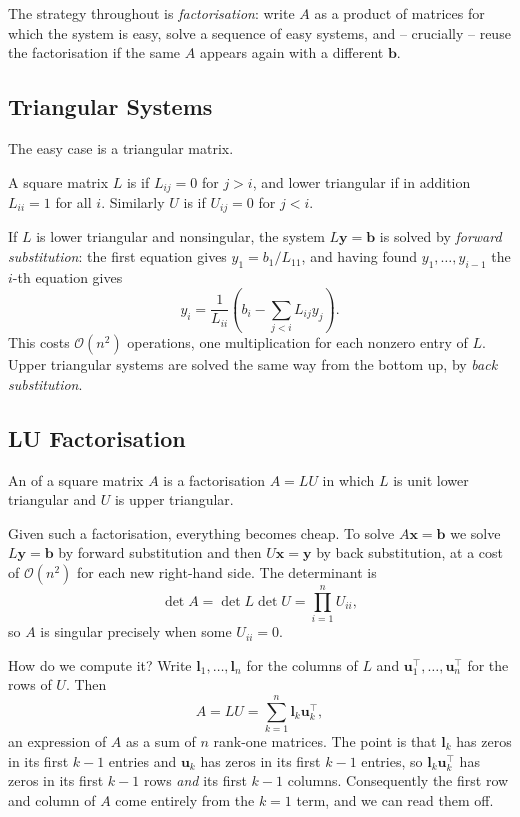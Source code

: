 The strategy throughout is \emph{factorisation}: write $A$ as a product of matrices for which the system is easy, solve a sequence of easy systems, and -- crucially -- reuse the factorisation if the same $A$ appears again with a different $\mathbf{b}$.

\subsection{Triangular Systems}

The easy case is a triangular matrix.

\begin{definition}
  A square matrix $L$ is  if $L_{ij} = 0$ for $j > i$, and  lower triangular if in addition $L_{ii} = 1$ for all $i$. Similarly $U$ is  if $U_{ij} = 0$ for $j < i$.
\end{definition}

If $L$ is lower triangular and nonsingular, the system $L\mathbf{y} = \mathbf{b}$ is solved by \emph{forward substitution}: the first equation gives $y_1 = b_1/L_{11}$, and having found $y_1, \dots, y_{i-1}$ the $i$-th equation gives
$$
y_i = \frac{1}{L_{ii}}\left(b_i - \sum_{j<i}L_{ij}y_j\right).
$$
This costs $\mathcal{O}(n^2)$ operations, one multiplication for each nonzero entry of $L$. Upper triangular systems are solved the same way from the bottom up, by \emph{back substitution}.

\subsection{LU Factorisation}

\begin{definition}[LU Factorisation]
  An  of a square matrix $A$ is a factorisation $A = LU$ in which $L$ is unit lower triangular and $U$ is upper triangular.
\end{definition}

Given such a factorisation, everything becomes cheap. To solve $A\mathbf{x} = \mathbf{b}$ we solve $L\mathbf{y} = \mathbf{b}$ by forward substitution and then $U\mathbf{x} = \mathbf{y}$ by back substitution, at a cost of $\mathcal{O}(n^2)$ for each new right-hand side. The determinant is
$$
\det A = \det L \det U = \prod_{i=1}^n U_{ii},
$$
so $A$ is singular precisely when some $U_{ii} = 0$.

How do we compute it? Write $\mathbf{l}_1, \dots, \mathbf{l}_n$ for the columns of $L$ and $\mathbf{u}_1^\top, \dots, \mathbf{u}_n^\top$ for the rows of $U$. Then
$$
A = LU = \sum_{k=1}^{n}\mathbf{l}_k \mathbf{u}_k^\top,
$$
an expression of $A$ as a sum of $n$ rank-one matrices. The point is that $\mathbf{l}_k$ has zeros in its first $k-1$ entries and $\mathbf{u}_k$ has zeros in its first $k-1$ entries, so $\mathbf{l}_k\mathbf{u}_k^\top$ has zeros in its first $k-1$ rows \emph{and} its first $k-1$ columns. Consequently the first row and column of $A$ come entirely from the $k=1$ term, and we can read them off.

